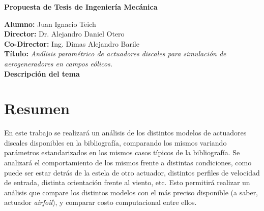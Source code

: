 \documentclass{article}
\newcommand{\thetitle}{Propuesta de Tesis de Ingeniería Mecánica}
\newcommand{\theauthorJT}{Juan Ignacio Teich}
\newcommand{\thedate}{Octubre 2023}
\numberwithin{equation}{subsection}
\begin{document}


\begin{center}
	{\bfseries \LARGE \thetitle}
\end{center}

\noindent \textbf{Alumno:} Juan Ignacio Teich\\
\textbf{Director:} Dr. Alejandro Daniel Otero\\
\textbf{Co-Director:} Ing. Dimas Alejandro Barile\\
\textbf{Título:} \textit{Análisis paramétrico de actuadores discales para simulación de aerogeneradores en campos eólicos.}\\

\textbf{\Large Descripción del tema}
\section{Resumen}
En este trabajo se realizará un análisis de los distintos modelos de actuadores discales disponibles en la bibliografía, comparando los mismos variando parámetros estandarizados en los mismos casos típicos de la bibliografía. Se analizará el comportamiento de los mismos frente a distintas condiciones, como puede ser estar detrás de la estela de otro actuador, distintos perfiles de velocidad de entrada, distinta orientación frente al viento, etc. Esto permitirá realizar un análisis que compare los distintos modelos con el más preciso disponible (a saber, actuador \textit{airfoil}), y comparar costo computacional entre ellos.
\end{document}
